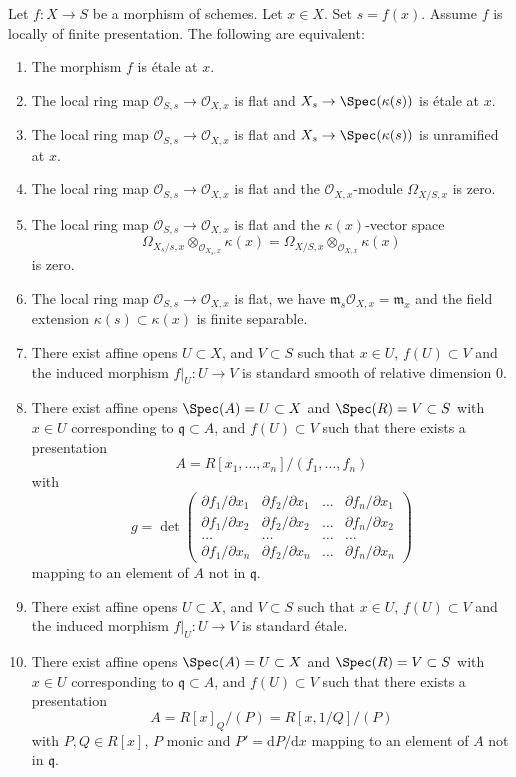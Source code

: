 \begin{lemma}
\label{lemma-etale-at-point}
Let $f : X \to S$ be a morphism of schemes.
Let $x \in X$.
Set $s = f(x)$.
Assume $f$ is locally of finite presentation.
The following are equivalent:
\begin{enumerate}
\item The morphism $f$ is \'etale at $x$.
\item The local ring map $\mathcal{O}_{S, s} \to \mathcal{O}_{X, x}$
is flat and $X_s \to \Spec(\kappa(s))$ is \'etale at $x$.
\item The local ring map $\mathcal{O}_{S, s} \to \mathcal{O}_{X, x}$
is flat and $X_s \to \Spec(\kappa(s))$ is unramified at $x$.
\item The local ring map $\mathcal{O}_{S, s} \to \mathcal{O}_{X, x}$
is flat and the $\mathcal{O}_{X, x}$-module $\Omega_{X/S, x}$
is zero.
\item The local ring map $\mathcal{O}_{S, s} \to \mathcal{O}_{X, x}$
is flat and the $\kappa(x)$-vector space
$$
\Omega_{X_s/s, x} \otimes_{\mathcal{O}_{X_s, x}} \kappa(x) =
\Omega_{X/S, x} \otimes_{\mathcal{O}_{X, x}} \kappa(x)
$$
is zero.
\item The local ring map $\mathcal{O}_{S, s} \to \mathcal{O}_{X, x}$
is flat, we have $\mathfrak m_s\mathcal{O}_{X, x} = \mathfrak m_x$ and
the field extension $\kappa(s) \subset \kappa(x)$ is finite
separable.
\item There exist affine opens $U \subset X$,
and $V \subset S$ such that $x \in U$, $f(U) \subset V$ and the
induced morphism $f|_U : U \to V$ is standard smooth
of relative dimension $0$.
\item There exist affine opens $\Spec(A) = U \subset X$
and $\Spec(R) = V \subset S$ with $x \in U$ corresponding
to $\mathfrak q \subset A$, and $f(U) \subset V$
such that there exists a presentation
$$
A = R[x_1, \ldots, x_n]/(f_1, \ldots, f_n)
$$
with
$$
g =
\det
\left(
\begin{matrix}
\partial f_1/\partial x_1 &
\partial f_2/\partial x_1 &
\ldots &
\partial f_n/\partial x_1 \\
\partial f_1/\partial x_2 &
\partial f_2/\partial x_2 &
\ldots &
\partial f_n/\partial x_2 \\
\ldots & \ldots & \ldots & \ldots \\
\partial f_1/\partial x_n &
\partial f_2/\partial x_n &
\ldots &
\partial f_n/\partial x_n
\end{matrix}
\right)
$$
mapping to an element of $A$ not in $\mathfrak q$.
\item There exist affine opens $U \subset X$,
and $V \subset S$ such that $x \in U$, $f(U) \subset V$ and the
induced morphism $f|_U : U \to V$ is standard \'etale.
\item There exist affine opens $\Spec(A) = U \subset X$
and $\Spec(R) = V \subset S$ with $x \in U$ corresponding
to $\mathfrak q \subset A$, and $f(U) \subset V$
such that there exists a presentation
$$
A = R[x]_Q/(P) = R[x, 1/Q]/(P)
$$
with $P, Q \in R[x]$, $P$ monic and $P' = \text{d}P/\text{d}x$ mapping to
an element of $A$ not in $\mathfrak q$.
\end{enumerate}
\end{lemma}

